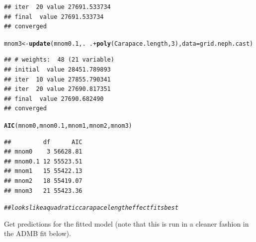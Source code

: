 \documentclass[12pt]{article}\usepackage[]{graphicx}\usepackage[]{color}
\makeatletter
\newcommand{\hlnum}[1]{\textcolor[rgb]{0.686,0.059,0.569}{#1}}%
\newcommand{\hlcom}[1]{\textcolor[rgb]{0.678,0.584,0.686}{\textit{#1}}}%
\newcommand{\hlopt}[1]{\textcolor[rgb]{0,0,0}{#1}}%
\newcommand{\hlstd}[1]{\textcolor[rgb]{0.345,0.345,0.345}{#1}}%
\newcommand{\hlkwb}[1]{\textcolor[rgb]{0.69,0.353,0.396}{#1}}%
\newcommand{\hlkwc}[1]{\textcolor[rgb]{0.333,0.667,0.333}{#1}}%
\newcommand{\hlkwd}[1]{\textcolor[rgb]{0.737,0.353,0.396}{\textbf{#1}}}%
\newenvironment{kframe}{%
 \def\at@end@of@kframe{}%
 \ifinner\ifhmode%
  \def\at@end@of@kframe{\end{minipage}}%
  \begin{minipage}{\columnwidth}%
 \fi\fi%
 \def\FrameCommand##1{\hskip\@totalleftmargin \hskip-\fboxsep
 \colorbox{shadecolor}{##1}\hskip-\fboxsep
     \hskip-\linewidth \hskip-\@totalleftmargin \hskip\columnwidth}%
 \MakeFramed {\advance\hsize-\width
   \@totalleftmargin\z@ \linewidth\hsize
   \@setminipage}}%
 {\par\unskip\endMakeFramed%
 \at@end@of@kframe}
\newenvironment{knitrout}{}{} %
\makeatother
\begin{document}
\begin{knitrout}
\begin{kframe}
\begin{verbatim}
## iter  20 value 27691.533734
## final  value 27691.533734 
## converged
\end{verbatim}
\begin{alltt}
\hlstd{mnom3} \hlkwb{<-} \hlkwd{update}\hlstd{(mnom0.1, .} \hlopt{~} \hlstd{.} \hlopt{+} \hlkwd{poly}\hlstd{(Carapace.length,} \hlnum{3}\hlstd{),} \hlkwc{data} \hlstd{= grid.neph.cast)}
\end{alltt}
\begin{verbatim}
## # weights:  48 (21 variable)
## initial  value 28451.789893 
## iter  10 value 27855.790341
## iter  20 value 27690.817351
## final  value 27690.682490 
## converged
\end{verbatim}
\begin{alltt}
\hlkwd{AIC}\hlstd{(mnom0, mnom0.1, mnom1, mnom2, mnom3)}
\end{alltt}
\begin{verbatim}
##         df      AIC
## mnom0    3 56628.81
## mnom0.1 12 55523.51
## mnom1   15 55422.13
## mnom2   18 55419.07
## mnom3   21 55423.36
\end{verbatim}
\begin{alltt}
\hlcom{## looks like a quadratic carapace length effect fits best}
\end{alltt}
\end{kframe}
\end{knitrout}


Get predictions for the fitted model (note that this is run in a cleaner fashion in the ADMB fit below).
\end{document}
